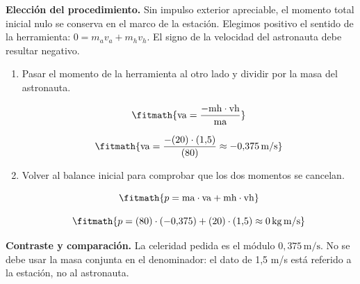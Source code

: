 \noindent\textbf{Elección del procedimiento.} Sin impulso exterior apreciable, el momento total inicial nulo se conserva en el marco de la estación. Elegimos positivo el sentido de la herramienta: $0=m_av_a+m_hv_h$. El signo de la velocidad del astronauta debe resultar negativo.

\begin{enumerate}

\item Pasar el momento de la herramienta al otro lado y dividir por la masa del astronauta.

\[\fitmath{\mathrm{va}=\frac{-\mathrm{mh}\cdot \mathrm{vh}}{\mathrm{ma}}}\]

\[\fitmath{\mathrm{va}=\frac{-(20)\cdot (1{,}5)}{(80)}\approx -0{,}375\,\mathrm{m/s}}\]

\item Volver al balance inicial para comprobar que los dos momentos se cancelan.

\[\fitmath{p=\mathrm{ma}\cdot \mathrm{va}+\mathrm{mh}\cdot \mathrm{vh}}\]

\[\fitmath{p=(80)\cdot (-0{,}375)+(20)\cdot (1{,}5)\approx 0\,\mathrm{kg\,m/s}}\]

\end{enumerate}

\noindent\textbf{Contraste y comparación.} La celeridad pedida es el módulo $0{,}375\,\mathrm{m/s}$. No se debe usar la masa conjunta en el denominador: el dato de 1,5 m/s está referido a la estación, no al astronauta.
